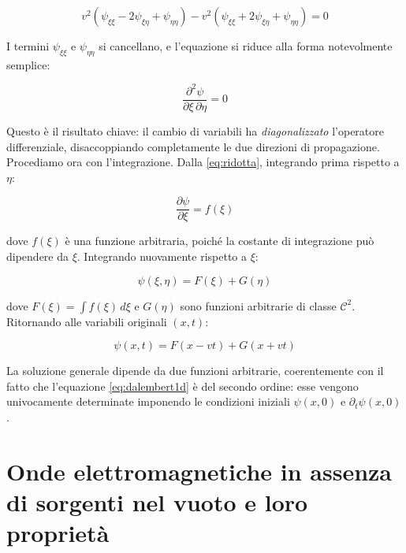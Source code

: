 \begin{equation}
    v^2\left(\psi_{\xi\xi} - 2\psi_{\xi\eta} + \psi_{\eta\eta}\right)
    - v^2\left(\psi_{\xi\xi} + 2\psi_{\xi\eta} + \psi_{\eta\eta}\right) = 0
\end{equation}

I termini $\psi_{\xi\xi}$ e $\psi_{\eta\eta}$ si cancellano, e l'equazione si riduce alla forma notevolmente semplice:

\begin{equation}
    \frac{\partial^2 \psi}{\partial \xi \, \partial \eta} = 0
    \label{eq:ridotta}
\end{equation}

Questo è il risultato chiave: il cambio di variabili ha \textit{diagonalizzato} l'operatore differenziale, disaccoppiando completamente le due direzioni di propagazione.\\

Procediamo ora con l'integrazione. Dalla \ref{eq:ridotta}, integrando  prima rispetto a $\eta$:

\begin{equation}
    \frac{\partial \psi}{\partial \xi} = f(\xi)
\end{equation}

dove $f(\xi)$ è una funzione arbitraria, poiché la costante di integrazione può dipendere da $\xi$. Integrando nuovamente rispetto a $\xi$:

\begin{equation}
    \psi(\xi, \eta) = F(\xi) + G(\eta)
\end{equation}

dove $F(\xi) = \int f(\xi)\, d\xi$ e $G(\eta)$ sono funzioni arbitrarie di classe $\mathcal{C}^2$. Ritornando alle variabili originali $(x, t)$:

\begin{tcolorbox}[colback=yellow!10!white, colframe=orange!70!black, boxrule=0.8pt]
\begin{equation}
    \psi(x, t) = F(x - vt) + G(x + vt)
\end{equation}
\end{tcolorbox}

La soluzione generale dipende da due funzioni arbitrarie, coerentemente con il fatto che l'equazione \ref{eq:dalembert1d} è del secondo ordine: esse vengono univocamente determinate imponendo le condizioni iniziali $\psi(x, 0)$ e $\partial_t \psi(x, 0)$.

\newpage

\section{Onde elettromagnetiche in assenza di sorgenti nel vuoto e loro proprietà}

